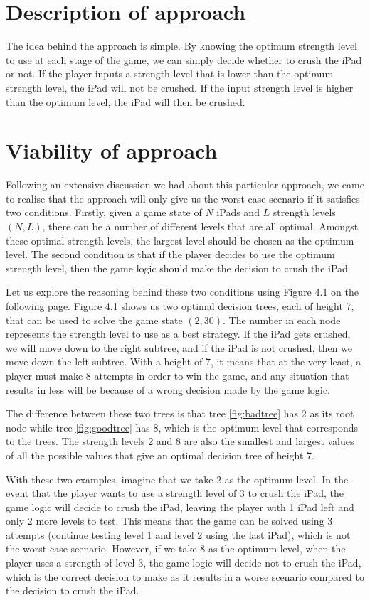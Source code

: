 \documentclass[12pt,a4paper,oneside]{report}
\begin{document}
\section{Description of approach}
The idea behind the approach is simple. By knowing the optimum strength level to use at each stage of the game, we can simply decide whether to crush the iPad or not. If the player inputs a strength level that is lower than the optimum strength level, the iPad will not be crushed. If the input strength level is higher than the optimum level, the iPad will then be crushed.

\section{Viability of approach}
Following an extensive discussion we had about this particular approach, we came to realise that the approach will only give us the worst case scenario if it satisfies two conditions. Firstly, given a game state of $N$ iPads and $L$ strength levels $(N,L)$, there can be a number of different levels that are all optimal. Amongst these optimal strength levels, the largest level should be chosen as the optimum level. The second condition is that if the player decides to use the optimum strength level, then the game logic should make the decision to crush the iPad.

Let us explore the reasoning behind these two conditions using Figure 4.1 on the following page. Figure 4.1 shows us two optimal decision trees, each of height 7, that can be used to solve the game state $(2,30)$. The number in each node represents the strength level to use as a best strategy. If the iPad gets crushed, we will move down to the right subtree, and if the iPad is not crushed, then we move down the left subtree. With a height of 7, it means that at the very least, a player must make 8 attempts in order to win the game, and any situation that results in less will be because of a wrong decision made by the game logic.

The difference between these two trees is that tree \ref{fig:badtree} has 2 as its root node while tree \ref{fig:goodtree} has 8, which is the optimum level that corresponds to the trees. The strength levels 2 and 8 are also the smallest and largest values of all the possible values that give an optimal decision tree of height 7. 

With these two examples, imagine that we take 2 as the optimum level. In the event that the player wants to use a strength level of 3 to crush the iPad, the game logic will decide to crush the iPad, leaving the player with 1 iPad left and only 2 more levels to test. This means that the game can be solved using 3 attempts (continue testing level 1 and level 2 using the last iPad), which is not the worst case scenario. However, if we take 8 as the optimum level, when the player uses a strength of level 3, the game logic will decide not to crush the iPad, which is the correct decision to make as it results in a worse scenario compared to the decision to crush the iPad. 
\end{document}
